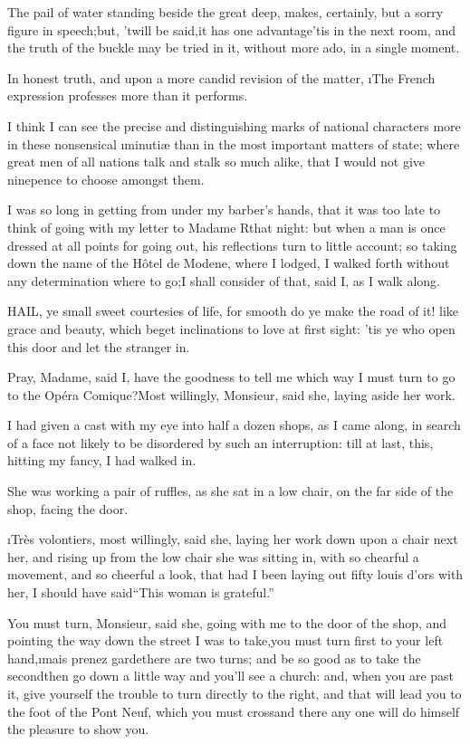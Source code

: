 \documentclass[twoside]{article}
\begin{document}
The pail of water standing beside the great deep, makes, certainly, but a
sorry figure in speech;\tsk but, ’twill be said,\tsk it has one advantage\tsk ’tis in
the next room, and the truth of the buckle may be tried in it, without
more ado, in a single moment.

In honest truth, and upon a more candid revision of the matter, \i{The
French expression professes more than it performs}.

I think I can see the precise and distinguishing marks of national
characters more in these nonsensical \i{minutiæ} than in the most important
matters of state; where great men of all nations talk and stalk so much
alike, that I would not give ninepence to choose amongst them.

I was so long in getting from under my barber’s hands, that it was too
late to think of going with my letter to Madame R\tsk  that night: but when a
man is once dressed at all points for going out, his reflections turn to
little account; so taking down the name of the Hôtel de Modene, where I
lodged, I walked forth without any determination where to go;\tsk I shall
consider of that, said I, as I walk along.






HAIL, ye small sweet courtesies of life, for smooth do ye make the road
of it! like grace and beauty, which beget inclinations to love at first
sight: ’tis ye who open this door and let the stranger in.

\tsk Pray, Madame, said I, have the goodness to tell me which way I must turn
to go to the Opéra Comique?\tsk Most willingly, Monsieur, said she, laying
aside her work.\tsk 

I had given a cast with my eye into half a dozen shops, as I came along,
in search of a face not likely to be disordered by such an interruption:
till at last, this, hitting my fancy, I had walked in.

She was working a pair of ruffles, as she sat in a low chair, on the far
side of the shop, facing the door.

\tsk \i{Très volontiers}, most willingly, said she, laying her work down upon a
chair next her, and rising up from the low chair she was sitting in, with
so chearful a movement, and so cheerful a look, that had I been laying
out fifty louis d’ors with her, I should have said\tsk “This woman is
grateful.”

You must turn, Monsieur, said she, going with me to the door of the shop,
and pointing the way down the street I was to take,\tsk you must turn first
to your left hand,\tsk \i{mais prenez garde}\tsk there are two turns; and be so
good as to take the second\tsk then go down a little way and you’ll see a
church: and, when you are past it, give yourself the trouble to turn
directly to the right, and that will lead you to the foot of the Pont
Neuf, which you must cross\tsk and there any one will do himself the pleasure
to show you.\tsk 
\end{document}
